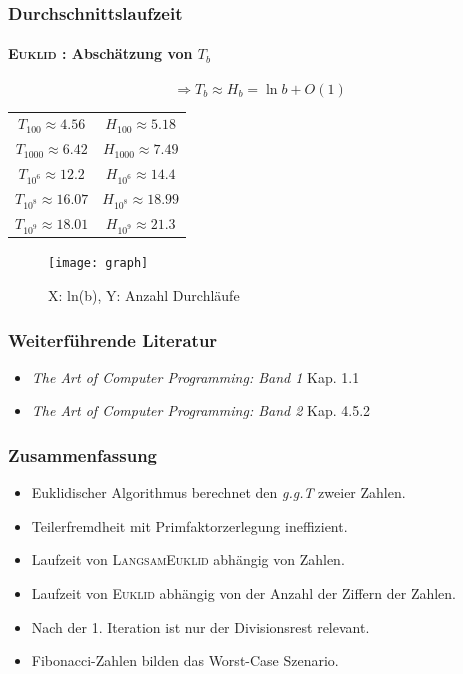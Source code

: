 \documentclass[•]{beamer}
\begin{document}
\begin{frame}
\frametitle{Durchschnittslaufzeit}
\framesubtitle{\textsc{Euklid} : Absch\"atzung von $T_b$}
$$ \Rightarrow T_b \approx H_b = \ln b + O(1)$$
\pause
 \begin{center}
 \begin{tabular}{|c|c|} \hline
 $T_{100} \approx 4.56$ & $H_{100} \approx 5.18$ \\ 
 $T_{1000} \approx 6.42$ & $H_{1000} \approx 7.49$ \\
 $T_{10^6} \approx 12.2$ & $H_{10^6} \approx 14.4$ \\ 
  $T_{10^8} \approx 16.07$ & $H_{10^8} \approx 18.99$ \\ 
    $T_{10^9} \approx 18.01$ & $H_{10^9} \approx 21.3$ \\ \hline
  
	 \end{tabular}
	  \end{center}

\end{frame}

\begin{frame}
	\begin{figure}
	\centering
	\texttt{[image: graph]}
	\caption*{\scriptsize{X: ln(b), Y: Anzahl Durchl\"aufe}}
	\end{figure}
\end{frame}

\begin{frame}
\frametitle{Weiterf\"uhrende Literatur}
\begin{itemize}
\item \textit{The Art of Computer Programming: Band 1} Kap. 1.1
\item \textit{The Art of Computer Programming: Band 2} Kap. 4.5.2
\end{itemize}
\end{frame}

\begin{frame}
\frametitle{Zusammenfassung}
\begin{itemize}
\item Euklidischer Algorithmus berechnet den \textit{g.g.T} zweier Zahlen.
\item Teilerfremdheit mit Primfaktorzerlegung ineffizient.
\item Laufzeit von \textsc{LangsamEuklid} abh\"angig von Zahlen.
\item Laufzeit von \textsc{Euklid} abh\"angig von der Anzahl der Ziffern der Zahlen.
\item Nach der 1. Iteration ist nur der Divisionsrest relevant.
\item Fibonacci-Zahlen bilden das Worst-Case Szenario.
\end{itemize}
\end{frame}
\end{document}

